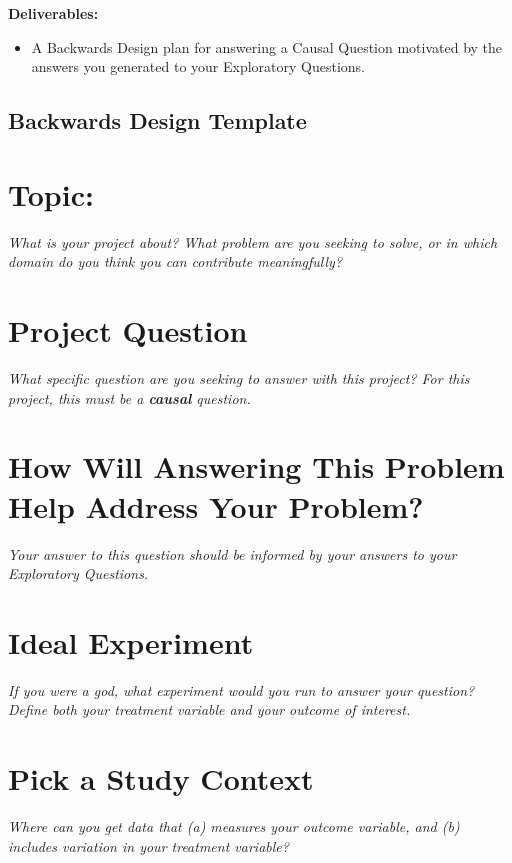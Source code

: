 \documentclass[12pt]{article}
\begin{document}
\textbf{Deliverables:}

\begin{itemize}
    \item A Backwards Design plan for answering a Causal Question motivated by the answers you generated to your Exploratory Questions.
\end{itemize}

\pagebreak

\subsection*{Backwards Design Template}

\section{Topic:}
\emph{What is your project about? What problem are you seeking to solve, or in which domain do you think you can contribute meaningfully?}
\vspace*{1cm}\\

\section{Project Question}
\emph{What specific question are you seeking to answer with this project? For this project, this must be a \textbf{causal} question.}
\vspace*{1cm}\\

\section{How Will Answering This Problem Help Address Your Problem?}
\emph{Your answer to this question should be informed by your answers to your Exploratory Questions.}
\vspace*{1cm}\\


\section{Ideal Experiment}
\emph{If you were a god, what experiment would you run to answer your question? Define both your treatment variable and your outcome of interest.}
\vspace*{1cm}\\

\section{Pick a Study Context}
\emph{Where can you get data that (a) measures your outcome variable, and (b) includes variation in your treatment variable?}
\vspace*{1cm}\\
\end{document}
